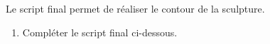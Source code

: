 Le script final permet de réaliser le contour de la sculpture.

\begin{enumerate}[resume]
\item Compléter le script final ci-dessous.

\begin{center}
\begin{scratch}
{
}
\end{scratch}
\end{center}
\end{enumerate}

